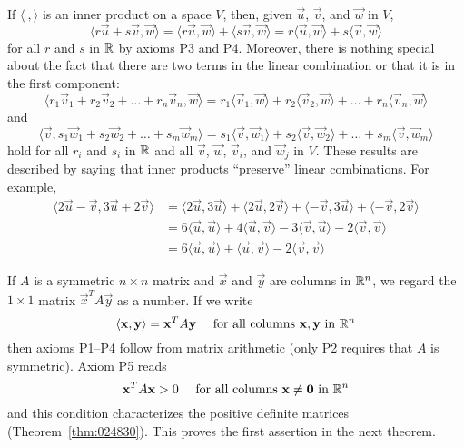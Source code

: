 \documentclass{ximera}
\begin{document}
If $\langle\ , \rangle$ is an inner product on a space $V$, then, given $\vec{u}$, $\vec{v}$, and $\vec{w}$ in $V$,
\begin{equation*}
\langle r\vec{u} + s\vec{v}, \vec{w} \rangle = \langle r\vec{u}, \vec{w} \rangle + \langle s\vec{v}, \vec{w} \rangle = r\langle \vec{u}, \vec{w} \rangle + s\langle \vec{v}, \vec{w} \rangle
\end{equation*}
for all $r$ and $s$ in $\mathbb{R}$ by axioms P3 and P4. Moreover, there is nothing special about the fact that there are two terms in the linear combination or that it is in the first component:
\begin{equation*}
\langle r_1\vec{v}_1 + r_2\vec{v}_2 + \dots + r_n\vec{v}_n, \vec{w} \rangle =
r_1\langle \vec{v}_1, \vec{w} \rangle +
r_2\langle \vec{v}_2, \vec{w} \rangle + \dots +
r_n\langle \vec{v}_n, \vec{w} \rangle
\end{equation*}
and
\begin{equation*}
\langle \vec{v}, s_1\vec{w}_1 + s_2\vec{w}_2 + \dots + s_m\vec{w}_m \rangle =
s_1\langle \vec{v}, \vec{w}_1 \rangle +
s_2\langle \vec{v}, \vec{w}_2 \rangle + \dots +
s_m\langle \vec{v}, \vec{w}_m \rangle
\end{equation*}
hold for all $r_{i}$ and $s_{i}$ in $\mathbb{R}$ and all $\vec{v}$, $\vec{w}$, $\vec{v}_{i}$, and $\vec{w}_{j}$ in $V$. These results are described by saying that inner products ``preserve'' linear combinations. For example,
\begin{align*}
\langle 2\vec{u} - \vec{v}, 3\vec{u} + 2\vec{v} \rangle &=
\langle 2\vec{u}, 3\vec{u} \rangle + \langle 2\vec{u}, 2\vec{v} \rangle + \langle -\vec{v}, 3\vec{u} \rangle + \langle -\vec{v}, 2\vec{v} \rangle \\
&= 6 \langle \vec{u}, \vec{u} \rangle + 4 \langle \vec{u}, \vec{v} \rangle -3 \langle \vec{v}, \vec{u} \rangle - 2 \langle \vec{v}, \vec{v} \rangle \\
&= 6 \langle \vec{u}, \vec{u} \rangle + \langle \vec{u}, \vec{v} \rangle - 2 \langle \vec{v}, \vec{v} \rangle
\end{align*}

If $A$ is a symmetric $n \times n$ matrix and $\vec{x}$ and $\vec{y}$ are columns in $\mathbb{R}^n$, we regard the $1 \times 1$ matrix $\vec{x}^{T}A\vec{y}$ as a number. If we write
\begin{equation*}
\langle \mathbf{x}, \mathbf{y} \rangle = \mathbf{x}^TA\mathbf{y} \quad \mbox{ for all columns } \mathbf{x}, \mathbf{y} \mbox{ in } \mathbb{R}^n
\end{equation*}
then axioms P1--P4 follow from matrix arithmetic (only P2 requires that $A$ is symmetric). Axiom P5 reads
\begin{equation*}
\mathbf{x}^TA \mathbf{x} > 0 \quad \mbox{ for all columns } \mathbf{x} \neq \mathbf{0} \mbox{ in } \mathbb{R}^n
\end{equation*}
and this condition characterizes the positive definite matrices  (Theorem~\ref{thm:024830}). This proves the first assertion in the next theorem.
\end{document}
